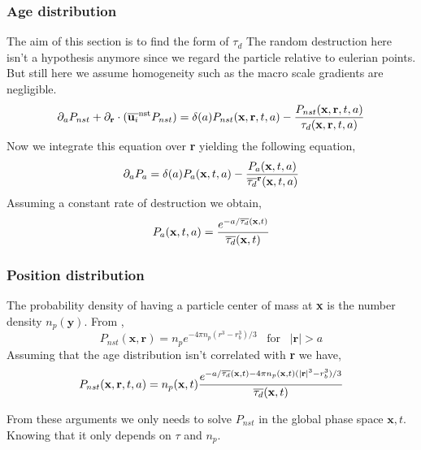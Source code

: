 \subsubsection{Age distribution}
The aim of this section is to find the form of $\tau_d$
The random destruction here isn't a hypothesis anymore since we regard the particle relative to eulerian points. 
But still here we assume homogeneity such as the macro scale gradients are negligible. 
\begin{align*}
    \partial_a P_{nst}
    + \partial_\textbf{r}\cdot  ( \overline{\textbf{u}_i}^\text{nst} P_{nst}) 
    &= \delta(a)P_{nst}(\textbf{x},\textbf{r},t,a)
    - \frac{P_{nst}(\textbf{x},\textbf{r},t,a)}
    {\tau_d(\textbf{x},\textbf{r},t,a)}\\
\end{align*} 
Now we integrate this equation over \textbf{r} yielding the following equation, 
\begin{align*}
    \partial_a P_{a}
    &= \delta(a)P_{a}(\textbf{x},t,a)
    - \frac{P_{a}(\textbf{x},t,a)}
    {\overline{\tau_d}^\textbf{r}(\textbf{x},t,a)}\\
\end{align*} 
Assuming a constant rate of destruction we obtain, 
\begin{align*}
    P_a(\textbf{x},t, a)  
    =\frac{e^{-a/\overline{\tau_d}(\textbf{x},t)}}{\overline{\tau_d}(\textbf{x},t)}
\end{align*} 
\subsubsection{Position distribution}
The probability density of having a particle center of mass at \textbf{x} is the number density $n_p(\textbf{y})$. 
From \citet{zhang2021ensemble}, 
\begin{equation}
    P_{nst}(\textbf{x},\textbf{r})
    = n_p e^{-4\pi n_p (r^3- r_b^3)/3}
\;\;\;
\text{for}
\;\;\;
|\textbf{r}| > a
\end{equation}
Assuming that the age distribution isn't correlated with \textbf{r} we have, 
\begin{equation}
    P_{nst}(\textbf{x},\textbf{r},t,a)
    = n_p(\textbf{x},t) 
    \frac{e^{-a/\overline{\tau_d}(\textbf{x},t) -4\pi n_p(\textbf{x},t) (|\textbf{r}|^3- r_b^3)/3}}{\overline{\tau_d}(\textbf{x},t)}
\end{equation}

From these arguments we only needs to solve $P_{nst}$ in the global phase space $\textbf{x},t$. 
Knowing that it only depends on $\tau$ and $n_p$. 